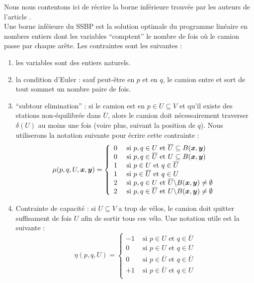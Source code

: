 Nous nous contentons ici de récrire la borne inférieure trouvée par les auteurs de l'article \cite{Benchimol2011}.
\\

Une borne inféieure du SSBP est la solution optimale du programme linéaire en nombres entiers dont les variables ``comptent'' le nombre de fois où le camion passe par chaque arête. Les contraintes sont les suivantes :
\begin{enumerate}[label=(\roman*)]
\item les variables sont des entiers naturels.
\item la condition d'Euler : sauf peut-être en $p$ et en $q$, le camion entre et sort de tout sommet un nombre paire de fois.
\item ``subtour elimination'' : si le camion est en $p \in U \subseteq V $ et qu'il existe des stations non-équilibrée dans $\overline{U}$, alors le camion doit nécessairement traverser $\delta(U)$ au moins une fois (voire plus, suivant la position de $q$). Nous utiliserons la notation suivante pour écrire cette contrainte :
\[
\mu(p,q,U,\boldsymbol{x},\boldsymbol{y}) = \left\{
\begin{array}{ll}
  0 &\mbox{ si } p,q \in U            \mbox{ et } \overline{U} \subseteq B(\boldsymbol{x},\boldsymbol{y})\\
  0 &\mbox{ si } p,q \in \overline{U} \mbox{ et } U \subseteq B(\boldsymbol{x},\boldsymbol{y})\\
  1 &\mbox{ si } p \in U              \mbox{ et } q \in \overline{U}\\
  1 &\mbox{ si } p \in \overline{U}   \mbox{ et } q \in U\\
  2 &\mbox{ si } p,q \in U            \mbox{ et } \overline{U} \backslash B(\boldsymbol{x},\boldsymbol{y}) \ne \emptyset\\
  2 &\mbox{ si } p,q \in \overline{U} \mbox{ et } U \backslash B(\boldsymbol{x},\boldsymbol{y}) \ne \emptyset
\end{array}
\right.
\]
\item Contrainte de capacité : si $U \subseteq V$ a trop de vélos, le camion doit quitter suffisament de fois $U$ afin de sortir tous ces vélo. Une notation utile est la suivante :
\[
\eta(p,q,U) = \left\{
\begin{array}{ll}
  -1 &\mbox{ si } p \in U            \mbox{ et } q \in \overline{U}\\
  0  &\mbox{ si } p \in U            \mbox{ et } q \in U\\
  0  &\mbox{ si } p \in \overline{U} \mbox{ et } q \in \overline{U}\\
  +1 &\mbox{ si } p \in \overline{U} \mbox{ et } q \in U\\
\end{array}
\right.
\]
\end{enumerate}

